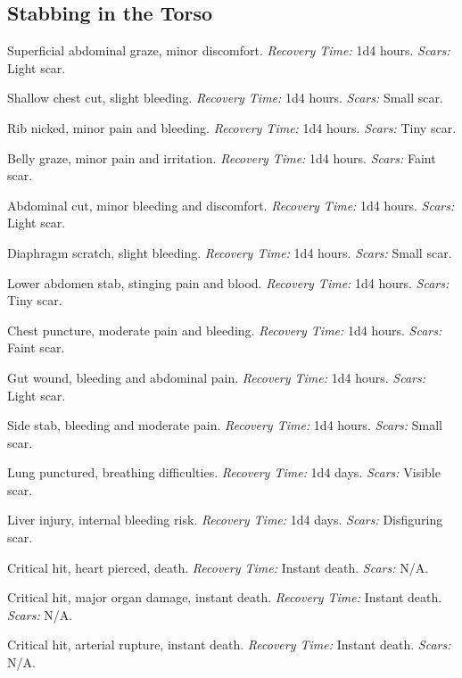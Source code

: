 \subsection{Stabbing in the Torso}

\begin{description}[labelwidth=1.5em, leftmargin=*, itemsep=0.4em]
    \item[1 -] Superficial abdominal graze, minor discomfort. \textit{Recovery Time:} 1d4 hours. \textit{Scars:} Light scar.
    \item[2 -] Shallow chest cut, slight bleeding. \textit{Recovery Time:} 1d4 hours. \textit{Scars:} Small scar.
    \item[3 -] Rib nicked, minor pain and bleeding. \textit{Recovery Time:} 1d4 hours. \textit{Scars:} Tiny scar.
    \item[4 -] Belly graze, minor pain and irritation. \textit{Recovery Time:} 1d4 hours. \textit{Scars:} Faint scar.
    \item[5 -] Abdominal cut, minor bleeding and discomfort. \textit{Recovery Time:} 1d4 hours. \textit{Scars:} Light scar.
    \item[6 -] Diaphragm scratch, slight bleeding. \textit{Recovery Time:} 1d4 hours. \textit{Scars:} Small scar.
    \item[7 -] Lower abdomen stab, stinging pain and blood. \textit{Recovery Time:} 1d4 hours. \textit{Scars:} Tiny scar.
    \item[8 -] Chest puncture, moderate pain and bleeding. \textit{Recovery Time:} 1d4 hours. \textit{Scars:} Faint scar.
    \item[9 -] Gut wound, bleeding and abdominal pain. \textit{Recovery Time:} 1d4 hours. \textit{Scars:} Light scar.
    \item[10 -] Side stab, bleeding and moderate pain. \textit{Recovery Time:} 1d4 hours. \textit{Scars:} Small scar.
    \item[11 -] Lung punctured, breathing difficulties. \textit{Recovery Time:} 1d4 days. \textit{Scars:} Visible scar.
    \item[12 -] Liver injury, internal bleeding risk. \textit{Recovery Time:} 1d4 days. \textit{Scars:} Disfiguring scar.
    \item[13 -] Critical hit, heart pierced, death. \textit{Recovery Time:} Instant death. \textit{Scars:} N/A.
    \item[14 -] Critical hit, major organ damage, instant death. \textit{Recovery Time:} Instant death. \textit{Scars:} N/A.
    \item[15 -] Critical hit, arterial rupture, instant death. \textit{Recovery Time:} Instant death. \textit{Scars:} N/A.

\end{description}
